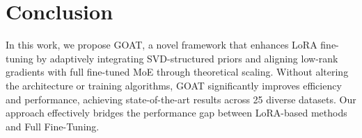 \vspace{-3mm}
\section{Conclusion}
In this work, we propose GOAT, a novel framework that enhances LoRA fine-tuning by adaptively integrating SVD-structured priors and aligning low-rank gradients with full fine-tuned MoE through theoretical scaling. Without altering the architecture or training algorithms, GOAT significantly improves efficiency and performance, achieving state-of-the-art results across 25 diverse datasets. Our approach effectively bridges the performance gap between LoRA-based methods and Full Fine-Tuning.